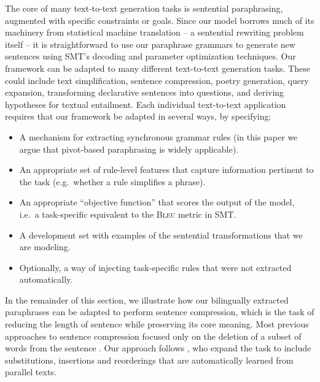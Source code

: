 \documentclass[11pt]{article}
\begin{document}
The core of many text-to-text generation tasks is sentential
paraphrasing, augmented with specific constraints or goals. Since our
model borrows much of its machinery from statistical machine
translation -- a sentential rewriting problem itself -- it is
straightforward to use our paraphrase grammars to generate new
sentences using SMT's decoding and parameter optimization
techniques. Our framework can be adapted to many different
text-to-text generation tasks.  These could include text
simplification, sentence compression, poetry generation, query
expansion, transforming declarative sentences into questions, and deriving
hypotheses for textual entailment.  Each individual text-to-text
application requires that our framework be adapted in several ways, by
specifying:
\begin{itemize}\addtolength{\itemsep}{-0.2\baselineskip}
\item A mechanism for extracting synchronous grammar rules (in this
  paper we argue that pivot-based paraphrasing is widely applicable).
\item An appropriate set of rule-level features that capture
  information pertinent to the task (e.g.\ whether a rule simplifies a
  phrase).
\item An appropriate ``objective function'' that scores the output of
  the model, i.e.\ a task-specific equivalent to the \textsc{Bleu}
  metric in SMT.
\item A development set with examples of the sentential
  transformations that we are modeling.
\item Optionally, a way of injecting task-specific rules that were not
  extracted automatically.
\end{itemize} 
In the remainder of this section, we illustrate how our bilingually
extracted paraphrases can be adapted to perform sentence compression,
which is the task of reducing the length of sentence while preserving
its core meaning.  Most previous approaches to sentence compression
focused only on the deletion of a subset of words from the sentence
\cite{KnightMarcuAI02}.  Our approach follows
, who expand the task to include
substitutions, insertions and reorderings that are automatically
learned from parallel texts.

\vspace{-.2cm}
\end{document}
